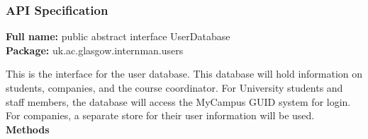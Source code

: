 \documentclass[11pt]{article}
\begin{document}
\subsubsection{API Specification}

\textbf{Full name:} public abstract interface UserDatabase\\

\textbf{Package:} uk.ac.glasgow.internman.users

This is the interface for the user database. This database will hold information
on students, companies, and the course coordinator. For University students and
staff members, the database will access the MyCampus GUID system for login. For
companies, a separate store for their user information will be used.\\

\textbf{Methods}
\end{document}
